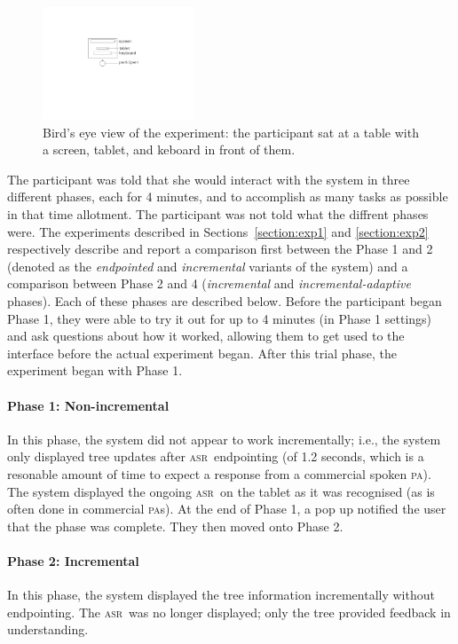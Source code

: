 \documentclass[11pt]{article}
\newcommand{\asr}[0]{\textsc{asr}}
\newcommand{\pa}[0]{\textsc{pa}}
\begin{document}
\begin{figure}[ht]
  \centering
      \includegraphics[width=0.4\textwidth]{figures/dataview.pdf}	
      \caption{Bird's eye view of the experiment: the participant sat at a table with a screen, tablet, and keboard in front of them. \label{fig:dataview}}
\end{figure}

The participant was told that she would interact with the system in three different phases, each for 4 minutes, and to accomplish as many tasks as possible in that time allotment. The participant was not told what the diffrent phases were. The experiments described in Sections~\ref{section:exp1} and \ref{section:exp2} respectively describe and report a comparison first between the Phase 1 and 2 (denoted as the \emph{endpointed} and \emph{incremental} variants of the system) and a comparison between Phase 2 and 4 (\emph{incremental} and \emph{incremental-adaptive} phases). Each of these phases are described below. Before the participant began Phase 1, they were able to try it out for up to 4 minutes (in Phase 1 settings) and ask questions about how it worked, allowing them to get used to the interface before the actual experiment began. After this trial phase, the experiment began with Phase 1.

\paragraph{Phase 1: Non-incremental} In this phase, the system did not appear to work incrementally; i.e., the system only displayed tree updates after \asr\ endpointing (of 1.2 seconds, which is a resonable amount of time to expect a response from a commercial spoken \pa). The system displayed the ongoing \asr\ on the tablet as it was recognised (as is often done in commercial \pa s). At the end of Phase 1, a pop up notified the user that the phase was complete. They then moved onto Phase 2.

\paragraph{Phase 2: Incremental} In this phase, the system displayed the tree information incrementally without endpointing. The \asr\ was no longer displayed; only the tree provided feedback in understanding. 
\end{document}
